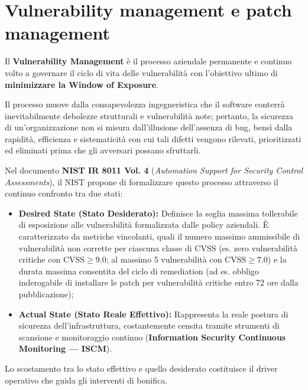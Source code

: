 \documentclass[../../main.tex]{subfiles}
\begin{document}
\section{Vulnerability management e patch management}
\label{sec:vulnerability_patch_management}

Il \textbf{Vulnerability Management} è il processo aziendale permanente e continuo volto a governare il ciclo di vita delle vulnerabilità con l'obiettivo ultimo di \textbf{minimizzare la Window of Exposure}.

Il processo muove dalla consapevolezza ingegneristica che il software conterrà inevitabilmente debolezze strutturali e vulnerabilità note; pertanto, la sicurezza di un'organizzazione non si misura dall'illusione dell'assenza di bug, bensì dalla rapidità, efficienza e sistematicità con cui tali difetti vengono rilevati, prioritizzati ed eliminati prima che gli avversari possano sfruttarli.

Nel documento \textbf{NIST IR 8011 Vol. 4} (\textit{Automation Support for Security Control Assessments}), il NIST propone di formalizzare questo processo attraverso il continuo confronto tra due stati:
\begin{itemize}
    \item \textbf{Desired State (Stato Desiderato):} Definisce la soglia massima tollerabile di esposizione alle vulnerabilità formalizzata dalle policy aziendali. È caratterizzato da metriche vincolanti, quali il numero massimo ammissibile di vulnerabilità non corrette per ciascuna classe di CVSS (es. zero vulnerabilità critiche con $\text{CVSS} \ge 9.0$; al massimo 5 vulnerabilità con $\text{CVSS} \ge 7.0$) e la durata massima consentita del ciclo di remediation (ad es. obbligo inderogabile di installare le patch per vulnerabilità critiche entro 72 ore dalla pubblicazione);
    \item \textbf{Actual State (Stato Reale Effettivo):} Rappresenta la reale postura di sicurezza dell'infrastruttura, costantemente censita tramite strumenti di scansione e monitoraggio continuo (\textbf{Information Security Continuous Monitoring --- ISCM}).
\end{itemize}

Lo scostamento tra lo stato effettivo e quello desiderato costituisce il driver operativo che guida gli interventi di bonifica.
\end{document}
